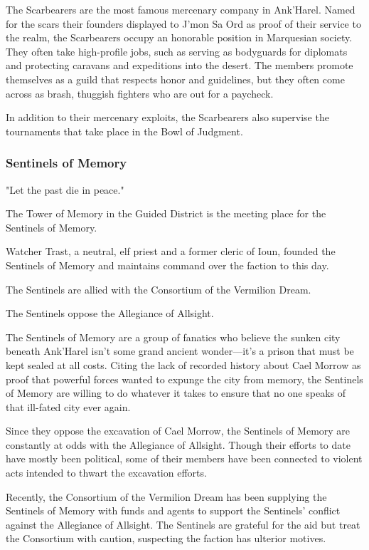\documentclass[10pt,a4paper,twoside,twocolumn,openany,nodeprecatedcode]{dndbook}
\begin{document}
The Scarbearers are the most famous mercenary company in Ank'Harel. Named for the scars their founders displayed to J'mon Sa Ord as proof of their service to the realm, the Scarbearers occupy an honorable position in Marquesian society. They often take high-profile jobs, such as serving as bodyguards for diplomats and protecting caravans and expeditions into the desert. The members promote themselves as a guild that respects honor and guidelines, but they often come across as brash, thuggish fighters who are out for a paycheck.

In addition to their mercenary exploits, the Scarbearers also supervise the tournaments that take place in the Bowl of Judgment.

\subsubsection{Sentinels of Memory}
"Let the past die in peace."


\begin{description}[nolistsep]
\item[Headquarters.]
The Tower of Memory in the Guided District is the meeting place for the Sentinels of Memory.
\item[Leader.]
Watcher Trast, a neutral, elf priest and a former cleric of Ioun, founded the Sentinels of Memory and maintains command over the faction to this day.
\item[Allies.]
The Sentinels are allied with the Consortium of the Vermilion Dream.
\item[Opponents.]
The Sentinels oppose the Allegiance of Allsight.
\end{description}

The Sentinels of Memory are a group of fanatics who believe the sunken city beneath Ank'Harel isn't some grand ancient wonder—it's a prison that must be kept sealed at all costs. Citing the lack of recorded history about Cael Morrow as proof that powerful forces wanted to expunge the city from memory, the Sentinels of Memory are willing to do whatever it takes to ensure that no one speaks of that ill-fated city ever again.

Since they oppose the excavation of Cael Morrow, the Sentinels of Memory are constantly at odds with the Allegiance of Allsight. Though their efforts to date have mostly been political, some of their members have been connected to violent acts intended to thwart the excavation efforts.

Recently, the Consortium of the Vermilion Dream has been supplying the Sentinels of Memory with funds and agents to support the Sentinels' conflict against the Allegiance of Allsight. The Sentinels are grateful for the aid but treat the Consortium with caution, suspecting the faction has ulterior motives.
\end{document}
